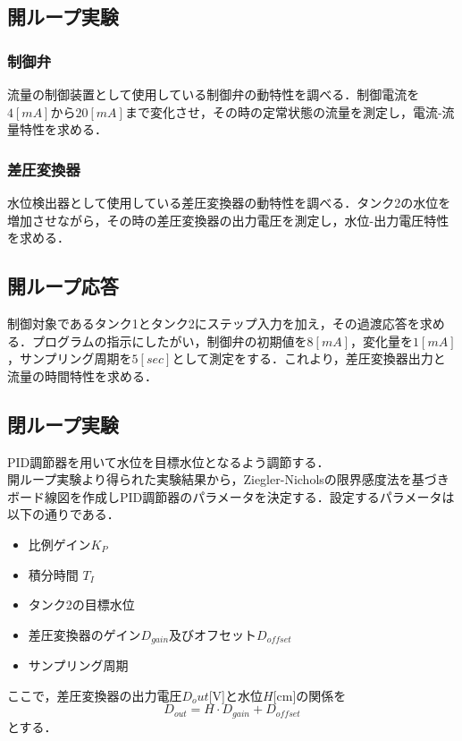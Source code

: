 \documentclass[11pt,a4paper]{jsarticle}
\begin{document}
  \subsection{開ループ実験}
   \subsubsection{制御弁}
   流量の制御装置として使用している制御弁の動特性を調べる．制御電流を$4[mA]$から$20[mA]$まで変化させ，その時の定常状態の流量を測定し，電流-流量特性を求める．
   \subsubsection{差圧変換器}
   水位検出器として使用している差圧変換器の動特性を調べる．タンク2の水位を増加させながら，その時の差圧変換器の出力電圧を測定し，水位-出力電圧特性を求める．
   \subsection{開ループ応答}
   制御対象であるタンク1とタンク2にステップ入力を加え，その過渡応答を求める．プログラムの指示にしたがい，制御弁の初期値を$8[mA]$，変化量を$1[mA]$，サンプリング周期を$5[sec]$として測定をする．これより，差圧変換器出力と流量の時間特性を求める．

\subsection{閉ループ実験}
PID調節器を用いて水位を目標水位となるよう調節する． \\
開ループ実験より得られた実験結果から，Ziegler-Nicholsの限界感度法を基づきボード線図を作成しPID調節器のパラメータを決定する．設定するパラメータは以下の通りである．\\
\begin{itemize}
 \item 比例ゲイン$K_P$ \\ 
 \item 積分時間 $T_I$\\
 \item タンク2の目標水位 \\
 \item 差圧変換器のゲイン$D_{gain}$及びオフセット$D_{offset}$ \\
 \item サンプリング周期 \\
\end{itemize}
ここで，差圧変換器の出力電圧$D_out$[V]と水位$H$[cm]の関係を
\begin{equation}
 D_{out} = H \cdot D_{gain} + D_{offset}
\end{equation}
とする．
\end{document}
